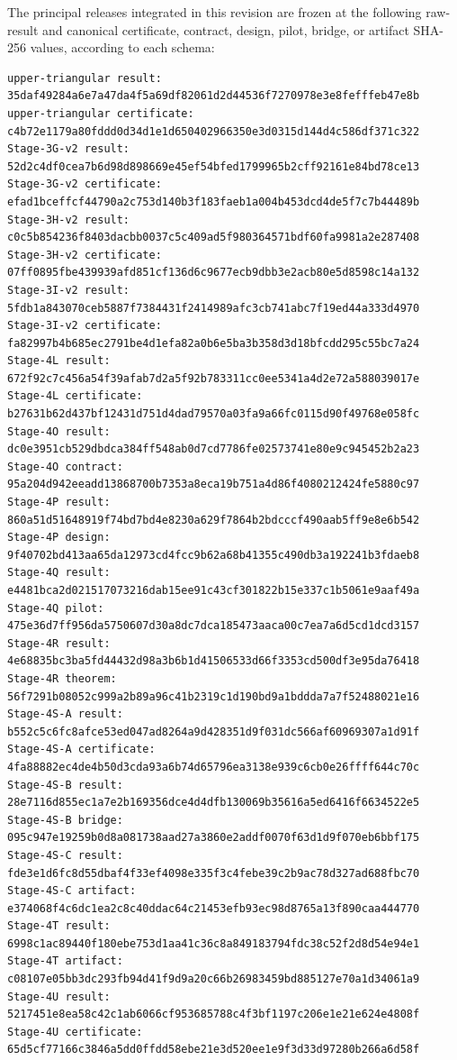 The principal releases integrated in this revision are frozen at the following
raw-result and canonical certificate, contract, design, pilot, bridge, or
artifact SHA-256 values, according to each schema:
\begin{verbatim}
upper-triangular result:
35daf49284a6e7a47da4f5a69df82061d2d44536f7270978e3e8fefffeb47e8b
upper-triangular certificate:
c4b72e1179a80fddd0d34d1e1d650402966350e3d0315d144d4c586df371c322
Stage-3G-v2 result:
52d2c4df0cea7b6d98d898669e45ef54bfed1799965b2cff92161e84bd78ce13
Stage-3G-v2 certificate:
efad1bceffcf44790a2c753d140b3f183faeb1a004b453dcd4de5f7c7b44489b
Stage-3H-v2 result:
c0c5b854236f8403dacbb0037c5c409ad5f980364571bdf60fa9981a2e287408
Stage-3H-v2 certificate:
07ff0895fbe439939afd851cf136d6c9677ecb9dbb3e2acb80e5d8598c14a132
Stage-3I-v2 result:
5fdb1a843070ceb5887f7384431f2414989afc3cb741abc7f19ed44a333d4970
Stage-3I-v2 certificate:
fa82997b4b685ec2791be4d1efa82a0b6e5ba3b358d3d18bfcdd295c55bc7a24
Stage-4L result:
672f92c7c456a54f39afab7d2a5f92b783311cc0ee5341a4d2e72a588039017e
Stage-4L certificate:
b27631b62d437bf12431d751d4dad79570a03fa9a66fc0115d90f49768e058fc
Stage-4O result:
dc0e3951cb529dbdca384ff548ab0d7cd7786fe02573741e80e9c945452b2a23
Stage-4O contract:
95a204d942eeadd13868700b7353a8eca19b751a4d86f4080212424fe5880c97
Stage-4P result:
860a51d51648919f74bd7bd4e8230a629f7864b2bdcccf490aab5ff9e8e6b542
Stage-4P design:
9f40702bd413aa65da12973cd4fcc9b62a68b41355c490db3a192241b3fdaeb8
Stage-4Q result:
e4481bca2d021517073216dab15ee91c43cf301822b15e337c1b5061e9aaf49a
Stage-4Q pilot:
475e36d7ff956da5750607d30a8dc7dca185473aaca00c7ea7a6d5cd1dcd3157
Stage-4R result:
4e68835bc3ba5fd44432d98a3b6b1d41506533d66f3353cd500df3e95da76418
Stage-4R theorem:
56f7291b08052c999a2b89a96c41b2319c1d190bd9a1bddda7a7f52488021e16
Stage-4S-A result:
b552c5c6fc8afce53ed047ad8264a9d428351d9f031dc566af60969307a1d91f
Stage-4S-A certificate:
4fa88882ec4de4b50d3cda93a6b74d65796ea3138e939c6cb0e26ffff644c70c
Stage-4S-B result:
28e7116d855ec1a7e2b169356dce4d4dfb130069b35616a5ed6416f6634522e5
Stage-4S-B bridge:
095c947e19259b0d8a081738aad27a3860e2addf0070f63d1d9f070eb6bbf175
Stage-4S-C result:
fde3e1d6fc8d55dbaf4f33ef4098e335f3c4febe39c2b9ac78d327ad688fbc70
Stage-4S-C artifact:
e374068f4c6dc1ea2c8c40ddac64c21453efb93ec98d8765a13f890caa444770
Stage-4T result:
6998c1ac89440f180ebe753d1aa41c36c8a849183794fdc38c52f2d8d54e94e1
Stage-4T artifact:
c08107e05bb3dc293fb94d41f9d9a20c66b26983459bd885127e70a1d34061a9
Stage-4U result:
5217451e8ea58c42c1ab6066cf953685788c4f3bf1197c206e1e21e624e4808f
Stage-4U certificate:
65d5cf77166c3846a5dd0ffdd58ebe21e3d520ee1e9f3d33d97280b266a6d58f

\end{verbatim}
